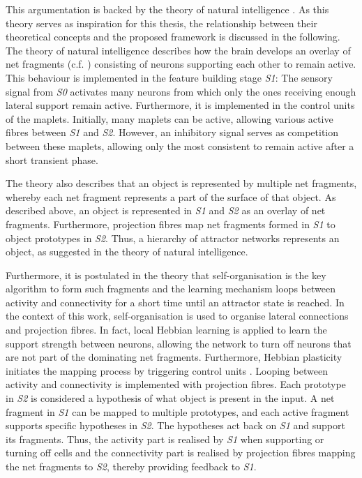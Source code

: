 This argumentation is backed by the theory of natural intelligence \cite{von_der_malsburg_theory_2022}.
As this theory serves as inspiration for this thesis, the relationship between their theoretical concepts and the proposed framework is discussed in the following.
The theory of natural intelligence describes how the brain develops an overlay of net fragments (c.f. ) consisting of neurons supporting each other to remain active.
This behaviour is implemented in the feature building stage \emph{S1}: The sensory signal from \emph{S0} activates many neurons from which only the ones receiving enough lateral support remain active. Furthermore, it is implemented in the control units of the maplets. Initially, many maplets can be active, allowing various active fibres between \emph{S1} and \emph{S2}. However, an inhibitory signal serves as competition between these maplets, allowing only the most consistent to remain active after a short transient phase.

The theory also describes that an object is represented by multiple net fragments, whereby each net fragment represents a part of the surface of that object.
As described above, an object is represented in \emph{S1} and \emph{S2} as an overlay of net fragments. Furthermore, projection fibres map net fragments formed in \emph{S1} to object prototypes in \emph{S2}.
Thus, a hierarchy of attractor networks represents an object, as suggested in the theory of natural intelligence.

Furthermore, it is postulated in the theory that self-organisation is the key algorithm to form such fragments and the learning mechanism loops between activity and connectivity for a short time until an attractor state is reached.
In the context of this work, self-organisation is used to organise lateral connections and projection fibres. In fact, local Hebbian learning \cite{hebb_organization_1949} is applied to learn the support strength between neurons, allowing the network to turn off neurons that are not part of the dominating net fragments.
Furthermore, Hebbian plasticity initiates the mapping process by triggering control units \cite{anderson_shifter_1987}.
Looping between activity and connectivity is implemented with projection fibres. 
Each prototype in \emph{S2} is considered a hypothesis of what object is present in the input. A net fragment in \emph{S1} can be mapped to multiple prototypes, and each active fragment supports specific hypotheses in \emph{S2}. The hypotheses act back on \emph{S1} and support its fragments. Thus, the activity part is realised by \emph{S1} when supporting or turning off cells and the connectivity part is realised by projection fibres mapping the net fragments to \emph{S2}, thereby providing feedback to \emph{S1}.

